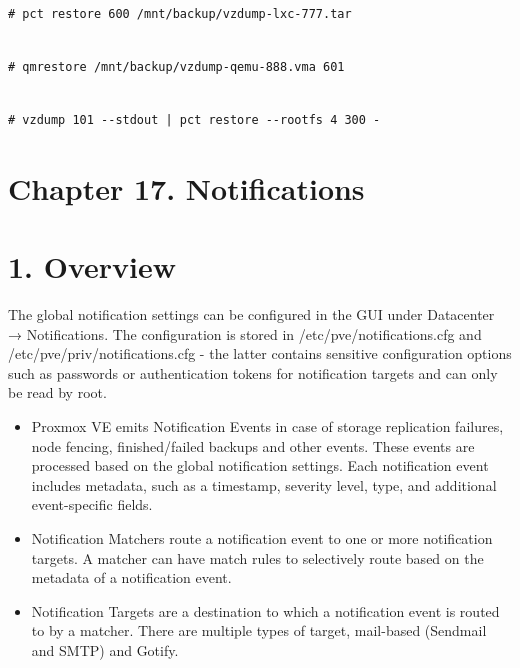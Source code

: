 \begin{lstlisting}

# pct restore 600 /mnt/backup/vzdump-lxc-777.tar

\end{lstlisting}

\begin{lstlisting}

# qmrestore /mnt/backup/vzdump-qemu-888.vma 601

\end{lstlisting}

\begin{lstlisting}

# vzdump 101 --stdout | pct restore --rootfs 4 300 -

\end{lstlisting}


\section{Chapter 17. Notifications}


\section{1. Overview}

The global notification settings can be configured in the GUI under Datacenter → Notifications. The configuration is stored in /etc/pve/notifications.cfg and /etc/pve/priv/notifications.cfg - the latter contains sensitive configuration options such as passwords or authentication tokens for notification targets and can only be read by root.

\begin{itemize}[leftmargin=2cm]

	\item Proxmox VE emits Notification Events in case of storage replication failures, node fencing, finished/failed backups and other events. These events are processed based on the global notification settings. Each notification event includes metadata, such as a timestamp, severity level, type, and additional event-specific fields.

	\item Notification Matchers route a notification event to one or more notification targets. A matcher can have match rules to selectively route based on the metadata of a notification event.

	\item Notification Targets are a destination to which a notification event is routed to by a matcher. There are multiple types of target, mail-based (Sendmail and SMTP) and Gotify.

\end{itemize}



